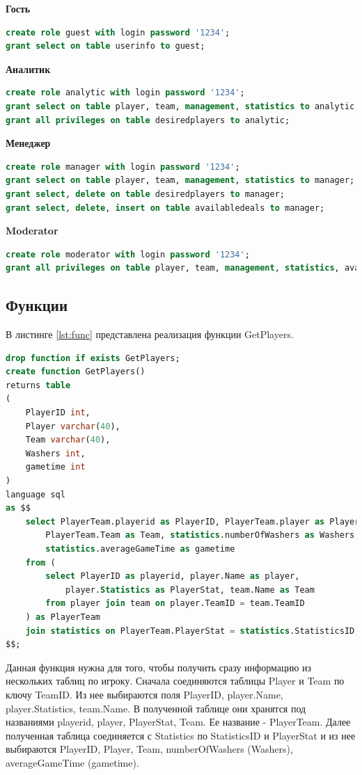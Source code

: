 \textbf{Гость}
\begin{lstlisting}[label={lst:guest},caption=Создание пользователя guest., language=SQL]
create role guest with login password '1234';
grant select on table userinfo to guest;
\end{lstlisting}

\textbf{Аналитик}
\begin{lstlisting}[label={lst:analytic},caption=Создание пользователя analytic., language=SQL]
create role analytic with login password '1234';
grant select on table player, team, management, statistics to analytic;
grant all privileges on table desiredplayers to analytic;
\end{lstlisting}

\textbf{Менеджер}
\begin{lstlisting}[label={lst:manager},caption=Создание пользователя manager., language=SQL]
create role manager with login password '1234';
grant select on table player, team, management, statistics to manager;
grant select, delete on table desiredplayers to manager;
grant select, delete, insert on table availabledeals to manager;
\end{lstlisting}

\textbf{Moderator}
\begin{lstlisting}[label={lst:moderator},caption=Создание пользователя moderator., language=SQL]
create role moderator with login password '1234';
grant all privileges on table player, team, management, statistics, availabledeals, desiredplayer, userinfo to moderator;
\end{lstlisting}

\subsection{Функции}
В листинге \ref{lst:func} представлена реализация функции GetPlayers.
\begin{lstlisting}[label={lst:func},caption=Реализация функции GetPlayers., language=SQL]
drop function if exists GetPlayers;
create function GetPlayers()
returns table
(
	PlayerID int,
	Player varchar(40),
	Team varchar(40),
	Washers int,
	gametime int
)
language sql
as $$
	select PlayerTeam.playerid as PlayerID, PlayerTeam.player as Player, 
		PlayerTeam.Team as Team, statistics.numberOfWashers as Washers, 
		statistics.averageGameTime as gametime
	from (
		select PlayerID as playerid, player.Name as player, 
			player.Statistics as PlayerStat, team.Name as Team
		from player join team on player.TeamID = team.TeamID
	) as PlayerTeam
	join statistics on PlayerTeam.PlayerStat = statistics.StatisticsID;
$$;
\end{lstlisting}
Данная функция нужна для того, чтобы получить сразу информацию из нескольких таблиц по игроку. Сначала соединяются таблицы Player и Team по ключу TeamID. Из нее выбираются поля PlayerID, player.Name, player.Statistics, team.Name. В полученной таблице они хранятся под названиями playerid, player, PlayerStat, Team. Ее название - PlayerTeam. Далее полученная таблица соединяется с Statistics по StatisticsID и PlayerStat и из нее выбираются PlayerID, Player, Team, numberOfWashers (Washers), averageGameTime (gametime).

